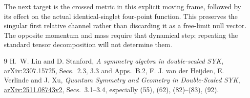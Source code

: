 \documentclass[11pt]{article}
\begin{document}
The next target is the crossed metric in this explicit moving
frame, followed by its effect on the actual identical-singlet
four-point function. This preserves the singular first relative
channel rather than discarding it as a free-limit null vector.
The opposite momentum and mass require that dynamical step;
repeating the standard tensor decomposition will not determine them.

\begin{thebibliography}{9}
 H.~W. Lin and D. Stanford,
\emph{A symmetry algebra in double-scaled SYK},
\href{https://arxiv.org/abs/2307.15725}{arXiv:2307.15725},
Secs.~2.3, 3.3 and Apps.~B.2, F.
 J. van der Heijden, E. Verlinde and J. Xu,
\emph{Quantum Symmetry and Geometry in Double-Scaled SYK},
\href{https://arxiv.org/abs/2511.08743v2}{arXiv:2511.08743v2},
Secs.~3.1--3.4, especially (55), (62), (82)--(83), (92).
\end{thebibliography}
\end{document}
